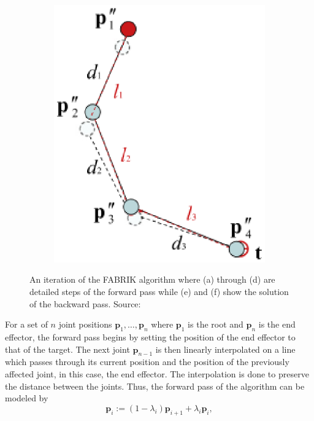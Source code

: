 \begin{figure}
\begin{subfigure}{0.2\textwidth}
        \includegraphics[width=\linewidth]{grafika/fabrik_iteration6.eps}
        \subcaption{}
        \label{fig:fabrik6}
    \end{subfigure}
    \caption{An iteration of the FABRIK algorithm where (a) through (d) are
    detailed steps of the forward pass while (e) and (f) show the solution of
    the backward pass. Source: \cite{Aristidou2011}}
    \label{fig:fabrik}
\end{figure}


For a set of \(n\) joint positions \(\mathbf{p}_1, \dots, \mathbf{p}_n\) where
\(\mathbf{p}_1\) is the root and \(\mathbf{p}_n\) is the end effector, the forward pass
begins by setting the position of the end effector to that of the target. The
next joint \(\mathbf{p}_{n-1}\) is then linearly interpolated on a line which
passes through its current position and the position of the previously affected
joint, in this case, the end effector. The interpolation is done to preserve the
distance between the joints. Thus, the forward pass of the algorithm can be
modeled by 
\begin{equation}
    \mathbf{p}_i := (1 - \lambda_i)\mathbf{p}_{i+1} + \lambda_i \mathbf{p}_i,
\end{equation}


